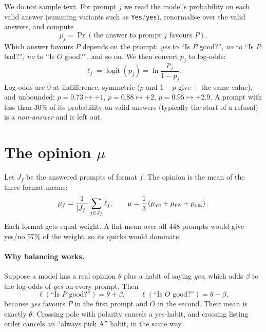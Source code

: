 \documentclass[11pt]{article}
\newcommand{\1}{\mathbbm{1}}
\DeclareMathOperator{\logit}{logit}
\begin{document}
We do not sample text. For prompt $j$ we read the model's probability on each
valid answer (summing variants such as \texttt{Yes}/\texttt{yes}), renormalise
over the valid answers, and compute
\begin{equation}
  p_j = \Pr(\text{the answer to prompt } j \text{ favours } P).
\end{equation}
Which answer favours $P$ depends on the prompt: \emph{yes} to ``Is $P$
good?'', \emph{no} to ``Is $P$ bad?'', \emph{no} to ``Is $O$ good?'', and so
on. We then convert $p_j$ to log-odds:
\begin{equation}
  \ell_j = \logit(p_j) = \ln\frac{p_j}{1-p_j}.
  \label{eq:logit}
\end{equation}
Log-odds are $0$ at indifference, symmetric ($p$ and $1-p$ give $\pm$ the same
value), and unbounded: $p=0.73 \mapsto +1$, $p=0.88 \mapsto +2$,
$p=0.95 \mapsto +2.9$. A prompt with less than $30\%$ of its probability on
valid answers (typically the start of a refusal) is a \emph{non-answer} and
is left out.

\section{The opinion \texorpdfstring{$\mu$}{mu}}\label{sec:mu}

Let $J_f$ be the answered prompts of format $f$. The opinion is the mean of
the three format means:
\begin{equation}
  \mu_f = \frac{1}{|J_f|}\sum_{j \in J_f} \ell_j,
  \qquad
  \mu = \frac{1}{3}\left(\mu_{\textsc{yn}} + \mu_{\textsc{pw}} + \mu_{\textsc{lik}}\right).
  \label{eq:mu}
\end{equation}
Each format gets equal weight. A flat mean over all 448 prompts would give
yes/no $57\%$ of the weight, so its quirks would dominate.

\paragraph{Why balancing works.} Suppose a model has a real opinion $\theta$
plus a habit of saying \emph{yes}, which adds $\beta$ to the log-odds of
\emph{yes} on every prompt. Then
\[
  \ell(\text{``Is } P \text{ good?''}) = \theta + \beta,
  \qquad
  \ell(\text{``Is } O \text{ good?''}) = \theta - \beta,
\]
because \emph{yes} favours $P$ in the first prompt and $O$ in the second. Their
mean is exactly $\theta$. Crossing pole with polarity cancels a yes-habit, and
crossing listing order cancels an ``always pick A'' habit, in the same way.
\end{document}
